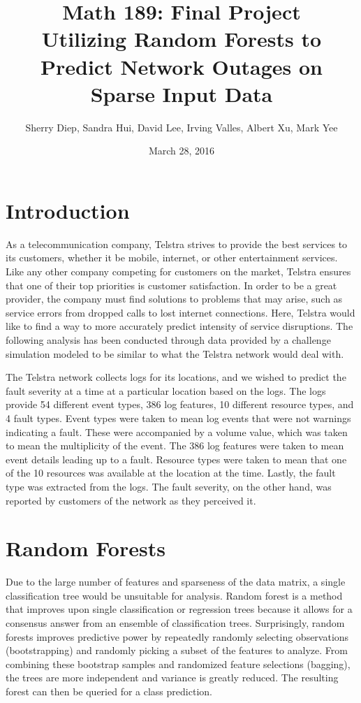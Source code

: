\documentclass[11pt]{article} %
\title{\textbf{Math 189: Final Project}\\Utilizing Random Forests to Predict Network Outages on Sparse Input Data}
\author{Sherry Diep, Sandra Hui, David Lee, Irving Valles, Albert Xu, Mark Yee}
\date{March 28, 2016}
\begin{document}
\maketitle

\section*{Introduction}
As a telecommunication company, Telstra strives to provide the best services to its customers, whether it be mobile, internet, or other entertainment services. Like any other company competing for customers on the market, Telstra ensures that one of their top priorities is customer satisfaction. In order to be a great provider, the company must find solutions to problems that may arise, such as service errors from dropped calls to lost internet connections. Here, Telstra would like to find a way to more accurately predict intensity of service disruptions. The following analysis has been conducted through data provided by a challenge simulation modeled to be similar to what the Telstra network would deal with.

The Telstra network collects logs for its locations, and we wished to predict the fault severity at a time at a particular location based on the logs. The logs provide 54 different event types, 386 log features, 10 different resource types, and 4 fault types. Event types were taken to mean log events that were not warnings indicating a fault. These were accompanied by a volume value, which was taken to mean the multiplicity of the event. The 386 log features were taken to mean event details leading up to a fault. Resource types were taken to mean that one of the 10 resources was available at the location at the time. Lastly, the fault type was extracted from the logs. The fault severity, on the other hand, was reported by customers of the network as they perceived it.

\section*{Random Forests}
Due to the large number of features and sparseness of the data matrix, a single classification tree would be unsuitable for analysis. Random forest is a method that improves upon single classification or regression trees because it allows for a consensus answer from an ensemble of classification trees. Surprisingly, random forests improves predictive power by repeatedly randomly selecting observations (bootstrapping) and randomly picking a subset of the features to analyze. From combining these bootstrap samples and randomized feature selections (bagging), the trees are more independent and variance is greatly reduced. The resulting forest can then be queried for a class prediction. 
\end{document}
